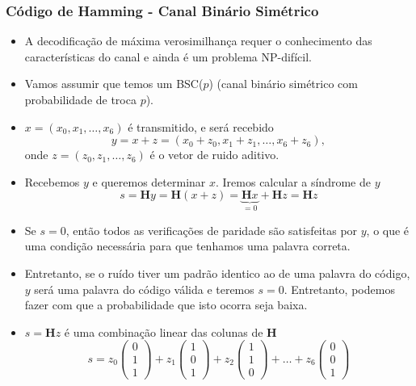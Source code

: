 \begin{frame}[allowframebreaks]
  \frametitle{Código de Hamming - Canal Binário Simétrico}

  \begin{itemize}
  \item A decodificação de máxima verosimilhança requer o conhecimento das características do canal
	e ainda é um problema NP-difícil.
  \item Vamos assumir que temos um BSC($p$) (canal binário simétrico com probabilidade de troca $p$).
  \item $x = (x_0, x_1, \ldots, x_6)$ é transmitido, e será recebido
	\begin{equation}
	y = x + z = (x_0 + z_0, x_1 + z_1, \ldots, x_6 + z_6) ,
	\end{equation}
	onde $z = (z_0, z_1, \ldots, z_6)$ é o vetor de ruido aditivo.
  \item Recebemos $y$ e queremos determinar $x$. Iremos calcular a síndrome de $y$
	\begin{equation}
	s = \mathbf{H} y = \mathbf{H} (x+z) = \underbrace{\mathbf{H} x}_{=0} + \mathbf{H} z = \mathbf{H} z
	\end{equation}
  \item Se $s=0$, então todos as verificações de paridade são satisfeitas por $y$, o que é uma condição 
	necessária para que tenhamos uma palavra correta.
  \item Entretanto, se o ruído tiver um padrão identico ao de uma palavra do código, $y$ será uma palavra do código válida e teremos $s=0$. Entretanto, podemos fazer com que a probabilidade que isto ocorra seja baixa.
  \item $s = \mathbf{H} z$ é uma combinação linear das colunas de $\mathbf{H}$
	\begin{equation}
	s = z_0 \begin{pmatrix} 0 \\ 1 \\ 1 \end{pmatrix} + z_1 \begin{pmatrix} 1 \\ 0 \\ 1 \end{pmatrix} + z_2 \begin{pmatrix} 1 \\ 1 \\ 0 \end{pmatrix} + \ldots + z_6 \begin{pmatrix} 0 \\ 0 \\ 1 \end{pmatrix}

\end{equation}
\end{itemize}
\end{frame}
